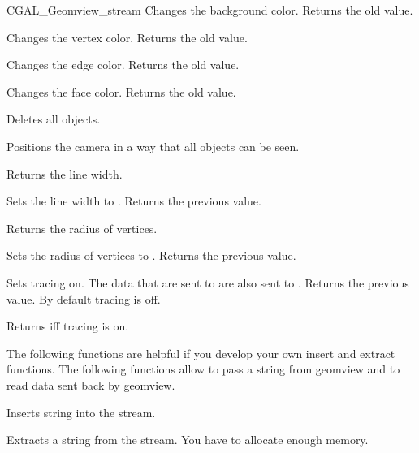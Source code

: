 \begin{ccClass}{CGAL_Geomview_stream}
{Changes the background color. Returns the old value.}

{Changes the vertex color. Returns the old value.}

{Changes the edge color. Returns the old value.}


{Changes the face color. Returns the old value.}



{Deletes all objects.}

{Positions the camera in a way that all objects can be seen.}

{Returns the line width.}

{Sets the line width to . Returns the previous value.}

{Returns the radius of vertices.}

{Sets the radius of vertices to . Returns the previous value.}

{Sets tracing on. The data that are sent to  are also
 sent to .  Returns the previous value. By default tracing is
 off.}

{Returns  iff tracing is on.}

\begin{ccAdvanced}


The following functions are helpful if you develop your own insert
and extract functions. The following functions allow to pass a string
from geomview and to read data sent back by geomview.

{Inserts string  into the stream.}


{Extracts a string  from the stream.
\ccPrecond You have to allocate enough memory.}


\end{ccAdvanced}
\end{ccClass}
